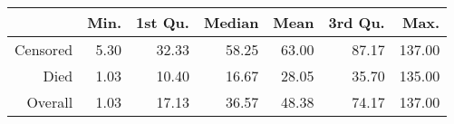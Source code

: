\begin{table}[ht]
\centering
\begin{tabular}{rrrrrrr}
  \hline
 & Min. & 1st Qu. & Median & Mean & 3rd Qu. & Max. \\ 
  \hline
Censored & 5.30 & 32.33 & 58.25 & 63.00 & 87.17 & 137.00 \\ 
  Died & 1.03 & 10.40 & 16.67 & 28.05 & 35.70 & 135.00 \\ 
  Overall & 1.03 & 17.13 & 36.57 & 48.38 & 74.17 & 137.00 \\ 
   \hline
\end{tabular}
\end{table}
